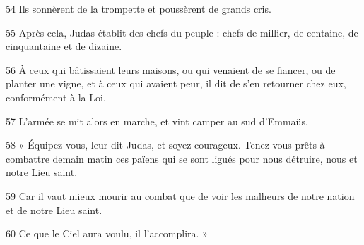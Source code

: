 
54 Ils sonnèrent de la trompette et poussèrent de grands cris.

55 Après cela, Judas établit des chefs du peuple : chefs de millier, de centaine, de cinquantaine et de dizaine.

56 À ceux qui bâtissaient leurs maisons, ou qui venaient de se fiancer, ou de planter une vigne, et à ceux qui avaient peur, il dit de s’en retourner chez eux, conformément à la Loi.

57 L’armée se mit alors en marche, et vint camper au sud d’Emmaüs.

58 « Équipez-vous, leur dit Judas, et soyez courageux. Tenez-vous prêts à combattre demain matin ces païens qui se sont ligués pour nous détruire, nous et notre Lieu saint.

59 Car il vaut mieux mourir au combat que de voir les malheurs de notre nation et de notre Lieu saint.

60 Ce que le Ciel aura voulu, il l’accomplira. »